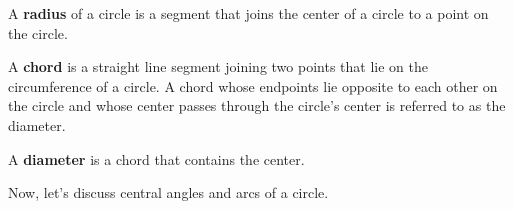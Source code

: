 \begin{figure}[htpb]
	\centering


	\label{fig:circle_with_radius_chord_and_diameter}
\end{figure}

\begin{definition}[Radius]
	\label{def:radius}

	A \textbf{radius} of a circle is a segment that joins the center of a circle
	to a point on the circle.
\end{definition}

\begin{definition}[Chord]
	\label{def:chord}

	A \textbf{chord} is a straight line segment joining two points that lie on
	the circumference of a circle. A chord whose endpoints lie opposite to each
	other on the circle and whose center passes through the circle's center is
	referred to as the diameter.
\end{definition}

\begin{definition}[Diameter]
	\label{def:diameter}

	A \textbf{diameter} is a chord that contains the center.
\end{definition}

Now, let's discuss central angles and arcs of a circle.

\begin{figure}[htpb]
	\centering


	\label{fig:angles_and_arcs_of_a_circle}
\end{figure}


